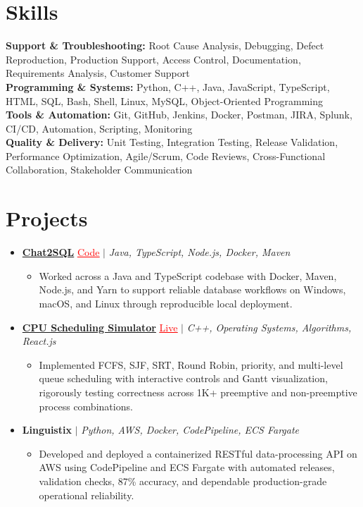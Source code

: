 \documentclass[letterpaper,10pt]{article}
\newcommand{\itemTail}{\vspace{-5pt}}
\newcommand{\sectionGap}{\vspace{-8pt}}
\newcommand{\projGap}{\vspace{3pt}}
\newcommand{\resumeItem}[1]{\item\small{{#1 \itemTail}}}
\newcommand{\resumeProjectHeading}[1]{\item \small #1 \vspace{-2pt}}
\newcommand{\resumeProjectLink}[2]{\href{#1}{\textcolor{red}{\underline{#2}}}}
\newcommand{\resumeSubHeadingListStart}{\begin{itemize}[leftmargin=0.0in, label={}]}
\newcommand{\resumeSubHeadingListEnd}{\end{itemize}}
\newcommand{\resumeProjItemListStart}{\begin{itemize}[leftmargin=0.15in,label=\textbullet,itemsep=3pt,topsep=0pt,parsep=0pt,partopsep=0pt]}
\newcommand{\resumeProjItemListEnd}{\end{itemize}\vspace{-4pt}}
\begin{document}
\section{Skills}
\begin{itemize}[leftmargin=0.15in, label={}]
\small{\item{
\textbf{Support \& Troubleshooting:} Root Cause Analysis, Debugging, Defect Reproduction, Production Support, Access Control, Documentation, Requirements Analysis, Customer Support \\
\textbf{Programming \& Systems:} Python, C++, Java, JavaScript, TypeScript, HTML, SQL, Bash, Shell, Linux, MySQL, Object-Oriented Programming \\
\textbf{Tools \& Automation:} Git, GitHub, Jenkins, Docker, Postman, JIRA, Splunk, CI/CD, Automation, Scripting, Monitoring \\
\textbf{Quality \& Delivery:} Unit Testing, Integration Testing, Release Validation, Performance Optimization, Agile/Scrum, Code Reviews, Cross-Functional Collaboration, Stakeholder Communication
}}
\end{itemize}
\sectionGap
\section{Projects}
\resumeSubHeadingListStart
\vspace{-2pt}
\resumeProjectHeading{\href{https://github.com/SAHAJ-BHADJA/Chat2SQL}{\textbf{Chat2SQL}} \resumeProjectLink{https://github.com/SAHAJ-BHADJA/Chat2SQL}{Code} $|$ \emph{Java, TypeScript, Node.js, Docker, Maven}}
\resumeProjItemListStart
\resumeItem{Worked across a Java and TypeScript codebase with Docker, Maven, Node.js, and Yarn to support reliable database workflows on Windows, macOS, and Linux through reproducible local deployment.}
\resumeProjItemListEnd
\projGap
\resumeProjectHeading{\href{https://cpu-scheduler-amber.vercel.app/}{\textbf{CPU Scheduling Simulator}} \resumeProjectLink{https://cpu-scheduler-amber.vercel.app/}{Live} $|$ \emph{C++, Operating Systems, Algorithms, React.js}}
\resumeProjItemListStart
\resumeItem{Implemented FCFS, SJF, SRT, Round Robin, priority, and multi-level queue scheduling with interactive controls and Gantt visualization, rigorously testing correctness across 1K+ preemptive and non-preemptive process combinations.}
\resumeProjItemListEnd
\projGap
\resumeProjectHeading{\textbf{Linguistix} $|$ \emph{Python, AWS, Docker, CodePipeline, ECS Fargate}}
\resumeProjItemListStart
\resumeItem{Developed and deployed a containerized RESTful data-processing API on AWS using CodePipeline and ECS Fargate with automated releases, validation checks, 87\% accuracy, and dependable production-grade operational reliability.}
\resumeProjItemListEnd
\resumeSubHeadingListEnd
\end{document}
